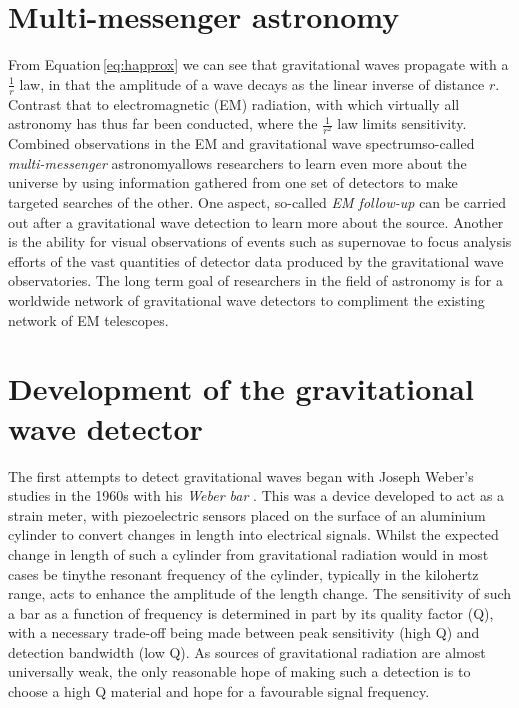 \section{Multi-messenger astronomy}
From Equation\,\ref{eq:happrox} we can see that gravitational waves propagate with a $\frac{1}{r}$ law, in that the amplitude of a wave decays as the linear inverse of distance $r$. Contrast that to electromagnetic (\gls{EM}) radiation, with which virtually all astronomy has thus far been conducted, where the $\frac{1}{r^2}$ law limits sensitivity. Combined observations in the \gls{EM} and gravitational wave spectrum\textemdash so-called \emph{multi-messenger} astronomy\textemdash allows researchers to learn even more about the universe by using information gathered from one set of detectors to make targeted searches of the other. One aspect, so-called \emph{\gls{EM} follow-up} can be carried out after a gravitational wave detection to learn more about the source. Another is the ability for visual observations of events such as supernovae to focus analysis efforts of the vast quantities of detector data produced by the gravitational wave observatories. The long term goal of researchers in the field of astronomy is for a worldwide network of gravitational wave detectors to compliment the existing network of \gls{EM} telescopes.

\section{Development of the gravitational wave detector}
The first attempts to detect gravitational waves began with Joseph Weber's studies in the 1960s with his \emph{Weber bar} \cite{Weber1960}. This was a device developed to act as a strain meter, with piezoelectric sensors placed on the surface of an aluminium cylinder to convert changes in length into electrical signals. Whilst the expected change in length of such a cylinder from gravitational radiation would in most cases be tiny\textemdash {}\textemdash the resonant frequency of the cylinder, typically in the kilohertz range, acts to enhance the amplitude of the length change. The sensitivity of such a bar as a function of frequency is determined in part by its quality factor (Q), with a necessary trade-off being made between peak sensitivity (high Q) and detection bandwidth (low Q). As sources of gravitational radiation are almost universally weak, the only reasonable hope of making such a detection is to choose a high Q material and hope for a favourable signal frequency.

